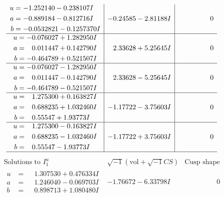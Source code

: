 \documentclass[1p]{elsarticle_modified}
\theoremstyle{definition}
\newcommand{\I}{\sqrt{-1}}
\begin{document}
$$\begin{array}{c|c|c}
\begin{aligned}
u &= -1.252140 - 0.238107 I \\
a &= -0.889184 - 0.812716 I \\
b &= -0.0532821 - 0.1257370 I\end{aligned}
 & -0.24585 - 2.81188 I & \phantom{-0.000000 } 0 \\ \hline\begin{aligned}
u &= -0.076027 + 1.282950 I \\
a &= \phantom{-}0.011447 + 0.142790 I \\
b &= -0.464789 + 0.521507 I\end{aligned}
 & \phantom{-}2.33628 + 5.25645 I & \phantom{-0.000000 } 0 \\ \hline\begin{aligned}
u &= -0.076027 - 1.282950 I \\
a &= \phantom{-}0.011447 - 0.142790 I \\
b &= -0.464789 - 0.521507 I\end{aligned}
 & \phantom{-}2.33628 - 5.25645 I & \phantom{-0.000000 } 0 \\ \hline\begin{aligned}
u &= \phantom{-}1.275300 + 0.163827 I \\
a &= \phantom{-}0.688235 + 1.032460 I \\
b &= \phantom{-}0.55547 + 1.93773 I\end{aligned}
 & -1.17722 - 3.75603 I & \phantom{-0.000000 } 0 \\ \hline\begin{aligned}
u &= \phantom{-}1.275300 - 0.163827 I \\
a &= \phantom{-}0.688235 - 1.032460 I \\
b &= \phantom{-}0.55547 - 1.93773 I\end{aligned}
 & -1.17722 + 3.75603 I & \phantom{-0.000000 } 0\\
 \hline 
 \end{array}$$\newpage$$\begin{array}{c|c|c}  
\text{Solutions to }I^u_{1}& \I (\text{vol} + \sqrt{-1}CS) & \text{Cusp shape}\\
 \hline 
\begin{aligned}
u &= \phantom{-}1.307530 + 0.476334 I \\
a &= \phantom{-}1.246040 - 0.069703 I \\
b &= \phantom{-}0.898713 + 1.080480 I\end{aligned}
 & -1.76672 - 6.33798 I & \phantom{-0.000000 } 0 \\ \hline\begin{aligned}

\end{aligned}
\end{array}$$
\end{document}
